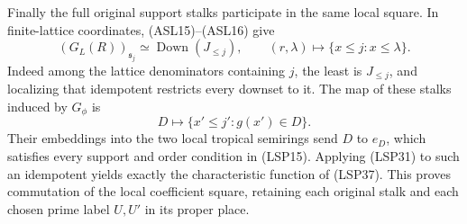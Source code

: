 Finally the full original support stalks participate in the same
local square. In finite-lattice coordinates, (ASL15)--(ASL16) give
\begin{equation}\tag{LSP36}
 (G_L(R))_{\mathfrak s_j}\simeq
 \operatorname{Down}(J_{\le j}),\qquad
 (r,\lambda)\longmapsto
     \{x\le j:x\le\lambda\}.
\end{equation}
Indeed among the lattice denominators containing $j$, the least
is $J_{\le j}$, and localizing that idempotent restricts every
downset to it. The map of these stalks induced by $G_\phi$ is
\begin{equation}\tag{LSP37}
 D\longmapsto\{x'\le j':g(x')\in D\}.
\end{equation}
Their embeddings into the two local tropical semirings send $D$
to $e_D$, which satisfies every support and order condition in
(LSP15). Applying (LSP31) to such an idempotent yields exactly the
characteristic function of (LSP37). This proves commutation of
the local coefficient square, retaining each original stalk and
each chosen prime label $U,U'$ in its proper place.
